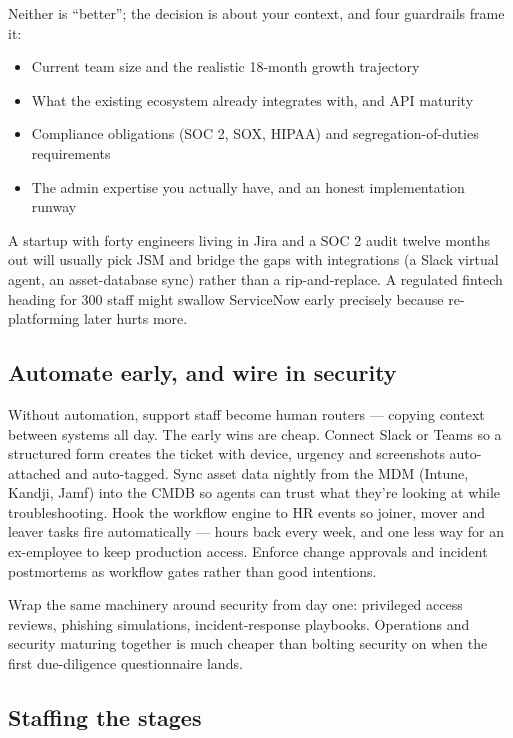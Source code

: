 Neither is ``better''; the decision is about your context, and four guardrails frame it:


\begin{itemize}[leftmargin=*]
\item Current team size and the realistic 18-month growth trajectory
\item What the existing ecosystem already integrates with, and API maturity
\item Compliance obligations (SOC 2, SOX, HIPAA) and segregation-of-duties requirements
\item The admin expertise you actually have, and an honest implementation runway
\end{itemize}

A startup with forty engineers living in Jira and a SOC 2 audit twelve months out will usually pick JSM and bridge the gaps with integrations (a Slack virtual agent, an asset-database sync) rather than a rip-and-replace. A regulated fintech heading for 300 staff might swallow ServiceNow early precisely because re-platforming later hurts more.



\subsection{Automate early, and wire in security}


Without automation, support staff become human routers — copying context between systems all day. The early wins are cheap. Connect Slack or Teams so a structured form creates the ticket with device, urgency and screenshots auto-attached and auto-tagged. Sync asset data nightly from the MDM (Intune, Kandji, Jamf) into the CMDB so agents can trust what they're looking at while troubleshooting. Hook the workflow engine to HR events so joiner, mover and leaver tasks fire automatically — hours back every week, and one less way for an ex-employee to keep production access. Enforce change approvals and incident postmortems as workflow gates rather than good intentions.


Wrap the same machinery around security from day one: privileged access reviews, phishing simulations, incident-response playbooks. Operations and security maturing together is much cheaper than bolting security on when the first due-diligence questionnaire lands.



\subsection{Staffing the stages}


